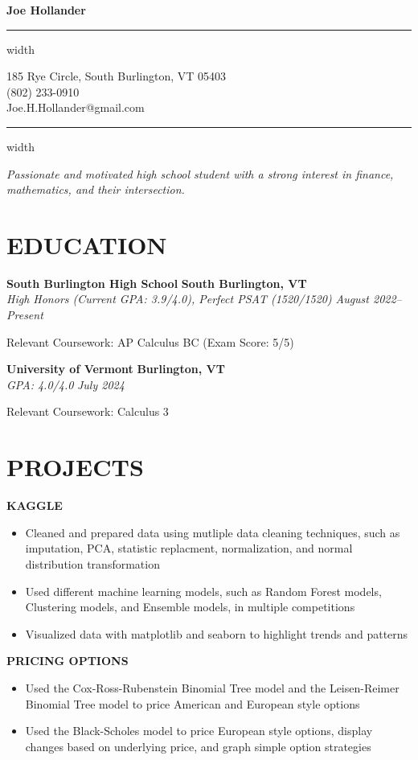 \documentclass[11pt,letterpaper]{article}
\newcommand{\name}[1]{
  \begin{center}
    \Huge\textbf{#1}
  \end{center}
  \vspace{-0.5em}
  \hrule height 0.4pt width \textwidth
  \vspace{0.5em}
}
\newcommand{\contact}[3]{
  \begin{center}
    #1 \\
    #2 \\
    #3
  \end{center}
  \vspace{-0.5em}
  \hrule height 0.4pt width \textwidth
  \vspace{0.5em}
}
\newcommand{\role}[4]{
  \begin{center}
  \textbf{#1} \hfill \textbf{#2} \\
  \textit{#3} \hfill \textit{#4}
  \end{center}
}
\begin{document}
\name{Joe Hollander}
\vspace{-0.5em}
\contact{185 Rye Circle, South Burlington, VT 05403}{(802) 233-0910}{Joe.H.Hollander@gmail.com}

\vspace{-0.5em}
\begin{center}
\textit{Passionate and motivated high school student with a strong interest in finance, mathematics, and their intersection. }
\end{center}

\section{EDUCATION}

\vspace{0.5em}
\role{South Burlington High School}{South Burlington, VT}{High Honors (Current GPA: 3.9/4.0), Perfect PSAT (1520/1520)}{August 2022--Present}   
\begin{flushleft}
Relevant Coursework: AP Calculus BC (Exam Score: 5/5)
\end{flushleft}

\role{University of Vermont}{Burlington, VT}{GPA: 4.0/4.0}{July 2024}
\begin{flushleft}
  Relevant Coursework: Calculus 3
  \end{flushleft}


\section{PROJECTS}
\vspace{1em}

\begin{flushleft}
  \textbf{KAGGLE}
  \begin{itemize}[leftmargin=*,nosep]
    \item Cleaned and prepared data using mutliple data cleaning techniques, such as imputation, PCA, statistic replacment, normalization, and normal distribution transformation
    \item Used different machine learning models, such as Random Forest models, Clustering models, and Ensemble models, in multiple competitions
    \item Visualized data with matplotlib and seaborn to highlight trends and patterns
  \end{itemize}
\end{flushleft}


\begin{flushleft}
  \textbf{PRICING OPTIONS}
  \begin{itemize}[leftmargin=*,nosep] 
    \item Used the Cox-Ross-Rubenstein Binomial Tree model and the Leisen-Reimer Binomial Tree model to price American and European style options
    \item Used the Black-Scholes model to price European style options, display changes based on underlying price, and graph simple option strategies
  \end{itemize}
\end{flushleft}
\end{document}
